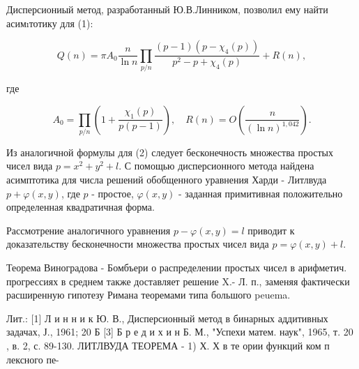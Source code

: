 \documentclass[10pt]{article}
\begin{document}
Дисперсиониый метод, разработанный Ю.В.Линником, позволил ему найти асимıтотику для (1):



\[

Q(n)=\pi A_{0} \frac{n}{\ln n} \prod_{p / n} \frac{(p-1)\left(p-\chi_{4}(p)\right)}{p^{2}-p+\chi_{4}(p)}+R(n),

\]



где



\[

A_{0}=\prod_{p / n}\left(1+\frac{\chi_{1}(p)}{p(p-1)}\right), \quad R(n)=O\left(\frac{n}{(\ln n)^{1,042}}\right) .

\]



Из аналогичной формулы для (2) следует бесконечность множества простых чисел вида $p=x^{2}+y^{2}+l$. С помощью дисперсионного метода найдена асимптотика для числа решений обобщенного уравнения Харди - Литлвуда $p+\varphi(x, y)$, где $p$ - простое, $\varphi(x, y)$ - заданная примитивная положительно определенная квадратичная форма.



Рассмотрение аналогичного уравнения $p-\varphi(x, y)=l$ приводит к доказательству бесконечности множества простых чисел вида $p=\varphi(x, y)+l$.



Теорема Виноградова - Бомбъери о распределении простых чисел в арифметич. прогрессиях в среднем также доставляет решение X.- Л. п., заменяя фактически расширенную гипотезу Римана теоремами типа большого peuema.



Лит.: [1] Л и н н и к Ю. В., Дисперсионный метод в бинарных аддитивных задачах, Ј., 1961; 20 Б [3] Б р е д и х и н Б. М., "Успехи матем. наук", 1965, т. 20 , в. 2, с. 89-130. ЛИТЛВУДА ТЕОРЕМА - 1) Х. Х в те ории функций ком п лексного пе-
\end{document}
